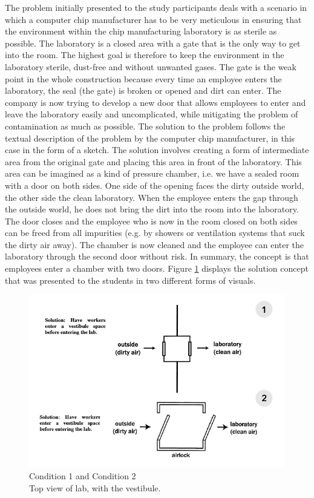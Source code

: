 \documentclass[12pt]{article}
\begin{document}
The problem initially presented to the study participants deals with a scenario in which a computer chip manufacturer has to be very meticulous in ensuring that the environment within the chip manufacturing laboratory is as sterile as possible. The laboratory is a closed area with a gate that is the only way to get into the room. The highest goal is therefore to keep the environment in the laboratory sterile, dust-free and without unwanted gases. The gate is the weak point in the whole construction because every time an employee enters the laboratory, the seal (the gate) is broken or opened and dirt can enter. The company is now trying to develop a new door that allows employees to enter and leave the laboratory easily and uncomplicated, while mitigating the problem of contamination as much as possible. The solution to the problem follows the textual description of the problem by the computer chip manufacturer, in this case in the form of a sketch. The solution involves creating a form of intermediate area from the original gate and placing this area in front of the laboratory. This area can be imagined as a kind of pressure chamber, i.e. we have a sealed room with a door on both sides. One side of the opening faces the dirty outside world, the other side the clean laboratory. When the employee enters the gap through the outside world, he does not bring the dirt into the room into the laboratory. The door closes and the employee who is now in the room closed on both sides can be freed from all impurities (e.g. by showers or ventilation systems that suck the dirty air away). The chamber is now cleaned and the employee can enter the laboratory through the second door without risk. In summary, the concept is that employees enter a chamber with two doors. Figure \ref{fig:input_conditions} displays the solution concept that was presented to the students in two different forms of visuals.

\begin{figure}[H]
  \centering
  \includegraphics[width=0.7\linewidth]{images/input_conditons.PNG}
  \caption{\label{fig:input_conditions} Condition 1 and Condition 2 \\ Top view of lab, with the vestibule.}
\end{figure}     
\end{document}
